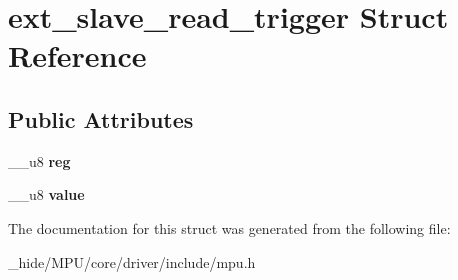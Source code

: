 \hypertarget{structext__slave__read__trigger}{}\section{ext\+\_\+slave\+\_\+read\+\_\+trigger Struct Reference}
\label{structext__slave__read__trigger}
\subsection*{Public Attributes}
\begin{DoxyCompactItemize}
\item 
\hypertarget{structext__slave__read__trigger_a7759a8e711c6044c6dddc46dac9ae900}{}\+\_\+\+\_\+u8 {\bfseries reg}\label{structext__slave__read__trigger_a7759a8e711c6044c6dddc46dac9ae900}

\item 
\hypertarget{structext__slave__read__trigger_a2c5b2e1a293fdba153fecee3a040cb6a}{}\+\_\+\+\_\+u8 {\bfseries value}\label{structext__slave__read__trigger_a2c5b2e1a293fdba153fecee3a040cb6a}

\end{DoxyCompactItemize}


The documentation for this struct was generated from the following file\+:\begin{DoxyCompactItemize}
\item 
\+\_\+hide/\+M\+P\+U/core/driver/include/mpu.\+h\end{DoxyCompactItemize}
